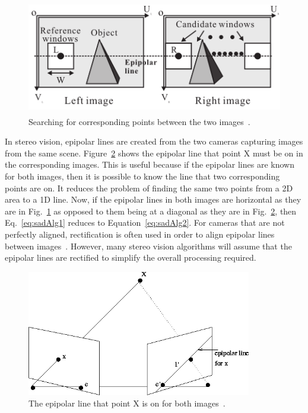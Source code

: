 \begin{figure}[h]
\begin{center}
	\includegraphics[height=50mm]{figures/sadCorrespondingWindows.png}
	\captionfonts
	\caption{Searching for corresponding points between the two images~\cite{sadParallel}.}
	\label{fig:sad_corr}
\end{center}
\end{figure}

In stereo vision, epipolar lines are created from the two cameras capturing images from the same scene. Figure~\ref{fig:epipolar} shows the epipolar line that point X must be on in the corresponding images. This is useful because if the epipolar lines are known for both images, then it is possible to know the line that two corresponding points are on. It reduces the problem of finding the same two points from a 2D area to a 1D line. Now, if the epipolar lines in both images are horizontal as they are in Fig.~\ref{fig:sad_corr} as opposed to them being at a diagonal as they are in Fig.~\ref{fig:epipolar}, then Eq.~\ref{eq:sadAlg1} reduces to Equation~\ref{eq:sadAlg2}. For cameras that are not perfectly aligned, rectification is often used in order to align epipolar lines between images~\cite{rectification}. However, many stereo vision algorithms will assume that the epipolar lines are rectified to simplify the overall processing required.

\begin{figure}[h]
\begin{center}
	\includegraphics[height=55mm]{figures/epipolar.png}
	\captionfonts
	\caption{The epipolar line that point X is on for both images~\cite{epipolar}.}
	\label{fig:epipolar}
\end{center}
\end{figure}

